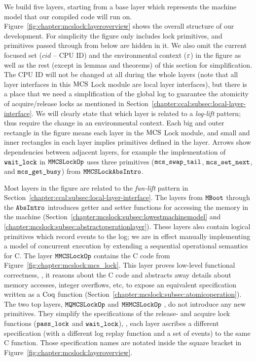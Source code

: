 We build five layers, starting from a base layer which represents the machine model that our compiled code will
run on.
Figure~\ref{fig:chapter:mcslock:layeroverview} shows the overall structure of our development.
For simplicity the figure only includes lock primitives, and
primitives passed through from below are hidden in it.
We also omit the current focused set ($cid$ -- CPU ID) and the environmental context (${\varepsilon}$) in the figure
 as well as the rest (except in lemmas and theorems) of this section for simplification.
The CPU ID will not be changed at all during the whole layers (note that all  layer interfaces in this $\mathrm{MCS}$ Lock module 
are local layer interfaces), but there is a place that we need a simplification of the global log to guarantee the atomicity of 
acquire/release locks as mentioned in Section~\ref{chapter:ccal:subsec:local-layer-interface}.
We will clearly state that which layer is related to a \textit{log-lift} pattern; 
thus require the change in an environmental context.
Each big and outer rectangle in the figure means each layer in the $\mathrm{MCS}$ Lock module, 
and small and inner rectangles in each layer implies primitives defined in the layer.
Arrows show dependencies between adjacent layers,
for example the implementation of ${\mathrm{\texttt{wait\_lock}}}$ in  ${\mathrm{\texttt{MMCSLockOp}}}$
uses three primitives (${\mathrm{\texttt{mcs\_swap\_tail}}}$,
${\mathrm{\texttt{mcs\_set\_next}}}$, and ${\mathrm{\texttt{mcs\_get\_busy}}}$) from  ${\mathrm{\texttt{MMCSLockAbsIntro}}}$.

Most layers in the figure are related to the \textit{fun-lift} pattern in Section~\ref{chapter:ccal:subsec:local-layer-interface}.
The layers from  ${\mathrm{\texttt{MBoot}}}$  through the ${\mathrm{\texttt{AbsIntro}}}$
introduces getter and setter functions for accessing the memory in the machine
(Section~\ref{chapter:mcslock:subsec:lowestmachinemodel} and
\ref{chapter:mcslock:subsec:abstractoperationlayer}). These layers also
contain logical primitives which record events to the log; we are in
effect manually implementing a model of concurrent execution by
extending a sequential operational semantics for C. 
The layer ${\mathrm{\texttt{MMCSLockOp}}}$ contains the C code from 
Figure~\ref{fig:chapter:mcslock:mcs_lock}. This layer proves low-level
functional correctness, \ie, it reasons about the C code and
abstracts away details about memory accesses, integer overflows, etc,
to expose an equivalent specification written as a $\mathrm{Coq}$
function (Section~\ref{chapter:mcslock:subsec:atomicoperation}).
The two top layers, ${\mathrm{\texttt{MQMCSLockOp}}}$ and ${\mathrm{\texttt{MHMCSLockOp}}}$ , do not introduce any new primitives.
They simplify the specifications of 
the release- and acquire lock functions (${\mathrm{\texttt{pass\_lock}}}$ and
${\mathrm{\texttt{wait\_lock}}}$), \ie, each layer ascribes a different
specification (with a different log replay function and a set of events)
to the same C function. Those specification names are notated inside the square bracket in Figure~\ref{fig:chapter:mcslock:layeroverview}.

